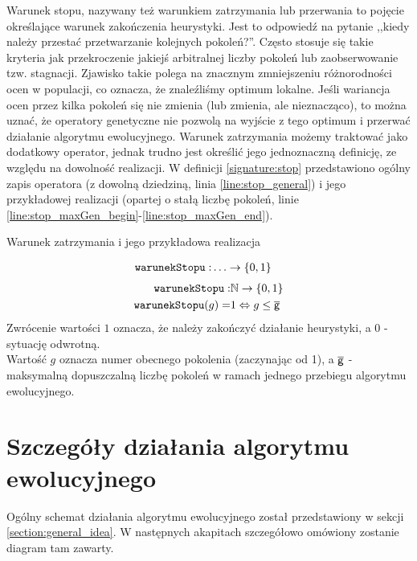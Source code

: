 \documentclass[./FM_mgr.tex]{subfiles}
\begin{document}
Warunek stopu, nazywany też warunkiem zatrzymania lub przerwania to pojęcie określające warunek zakończenia heurystyki. Jest to odpowiedź na pytanie ,,kiedy należy przestać przetwarzanie kolejnych pokoleń?''. Często stosuje się takie kryteria jak przekroczenie jakiejś arbitralnej liczby pokoleń lub zaobserwowanie tzw. stagnacji. Zjawisko takie polega na znacznym zmniejszeniu różnorodności ocen w populacji, co oznacza, że znaleźliśmy optimum lokalne. Jeśli wariancja ocen przez kilka pokoleń się nie zmienia (lub zmienia, ale nieznacząco), to można uznać, że operatory genetyczne nie pozwolą na wyjście z tego optimum i przerwać działanie algorytmu ewolucyjnego. 
Warunek zatrzymania możemy traktować jako dodatkowy operator, jednak trudno jest określić jego jednoznaczną definicję, ze względu na dowolność realizacji. W definicji \ref{signature:stop} przedstawiono ogólny zapis operatora (z dowolną dziedziną, linia \ref{line:stop_general}) i jego przykładowej realizacji (opartej o stałą liczbę pokoleń, linie \ref{line:stop_maxGen_begin}-\ref{line:stop_maxGen_end}).

\begin{signature}
	\caption{Warunek zatrzymania i jego przykładowa realizacja \label{signature:stop}} 
	\begin{align}
		\label{line:stop_general}
		\mathtt{warunekStopu}: &\ldots \rightarrow \left\{ 0, 1 \right\}
	\end{align}
	\begin{align}
		\label{line:stop_maxGen_begin}
		\mathtt{warunekStopu}: &\mathbb{N} \rightarrow \left\{ 0, 1 \right\} \\
		\label{line:stop_maxGen_end}
		\mathtt{warunekStopu}(g) = &1 \Leftrightarrow g \leq \overline{\mathsf{g}}
	\end{align}
	Zwrócenie wartości $1$ oznacza, że należy zakończyć działanie heurystyki, a $0$ - sytuację odwrotną. \\ 
	Wartość $g$ oznacza numer obecnego pokolenia (zaczynając od 1), a $\overline{\mathsf{g}}$ - maksymalną dopuszczalną liczbę pokoleń w ramach jednego przebiegu algorytmu ewolucyjnego.
\end{signature}	

\section{Szczegóły działania algorytmu ewolucyjnego} \label{section:ea_details}

Ogólny schemat działania algorytmu ewolucyjnego został przedstawiony w sekcji \ref{section:general_idea}. 
W następnych akapitach szczegółowo omówiony zostanie diagram tam zawarty.
\end{document}
